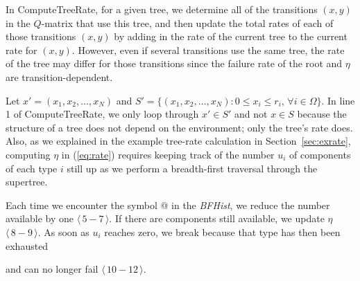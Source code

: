 \documentclass[12pt]{article}
\def\myxout{\bgroup \markoverwith{\textcolor{red}{\hbox to.35em{\hss/\hss}}}\ULon}
\newcommand{\deleted}[1]{}
\newcommand{\changed}[1]{#1}
\newcommand{\changed}[1]{\textcolor{red}{#1}}
\newcommand{\deleted}[1]{{\myxout{#1}}}
\newcommand{\varName}[1]{\textrm{\it#1}}
\newcommand{\citeLine}[1]{$\langle \, #1 \, \rangle$}
\newcommand{\citeBlock}[2]{$\langle \, #1 - #2 \, \rangle$}
\begin{document}
In ComputeTreeRate, for a given tree, we determine all of the transitions $(x, y)$ in the $Q$-matrix that use this tree, and then update the total rates of each of those transitions $(x, y)$ by adding in the rate of the current tree to the current rate for $(x, y)$. However, even if several transitions use the same tree, the rate of the tree may differ for those transitions since the failure rate of the root and $\eta$ are transition-dependent.

Let $x' = (x_{1}, x_{2}, \ldots, x_{N})$ and $S' = \changed{\{}(x_{1}, x_{2}, \ldots, x_{N}): 0 \leq x_{i} \leq r_{i}, \, \forall i \in \Omega \changed{\}}$. In line 1 of ComputeTreeRate, we only loop through 
$x' \changed{\in S'}$ and not 
$x \changed{\in S}$ because the structure of a tree does not depend on the environment; only the tree's rate does.
\changed{Also, as we explained in the
example tree-rate calculation
in Section~\ref{sec:exrate},
computing $\eta$ in (\ref{eq:rate})
requires keeping track of the
number $u_i$ of components of each
type $i$ still up as we perform
a breadth-first traversal through the
supertree.}
\deleted{
For each component type $i$ in $\Omega$, we calculate the number of components that are available in the system
\changed{as} $u_{i} = r_{i}
- x_i' \deleted{n_{i}(x)}$.
The number $u_{i}$ determines until which point, while traversing through the \varName{BFHist}[$i$], we can still have components of type $i$ that could have failed but did not fail \citeLine{4}. We cannot have components of a type that could have failed but did not after a point in the tree where its type has been exhausted.
A type is exhausted when the total number of failed components of the type (i.e., the sum of the components already failed in $x'$ and in the tree in breadth-first order until the current node in the \varName{BFHist}[$i$]) equals the redundancy of the type.}
Each time we encounter the symbol @ in the \varName{BFHist}, we reduce the number available by one \citeBlock{5}{7}. If there are components still available, we update $\eta$ \citeBlock{8}{9}. As soon as $u_{i}$ reaches zero, we break because that type has then been exhausted
\deleted{i.e., there are no more components that could have failed for the type}
\changed{and can no longer
fail}
\citeBlock{10}{12}.
\end{document}
